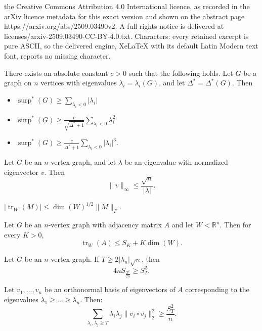 \documentclass[10pt,a4paper]{amsart}
\DeclareMathOperator{\surp}{surp}
\DeclareMathOperator{\trace}{tr}
\begin{document}
the Creative Commons Attribution 4.0 International licence, as recorded in the arXiv licence metadata for this exact version and shown on the abstract page https://arxiv.org/abs/2509.03490v2. A full rights notice is delivered at licenses/arxiv-2509.03490-CC-BY-4.0.txt. Characters: every retained excerpt is pure ASCII, so the delivered engine, XeLaTeX with its default Latin Modern text font, reports no missing character.
\begin{lemma}\label{lemma:surp_star}
There exists an absolute constant $c>0$ such that the following holds. Let $G$ be a graph on $n$ vertices with eigenvalues $\lambda_i=\lambda_i(G)$, and let $\Delta^*=\Delta^*(G)$. Then
\begin{itemize}
    \item[(i)] $\surp^*(G)\geq \displaystyle\sum_{\lambda_i<0}|\lambda_i|$
    \item[(ii)] $\surp^*(G)\geq\frac{c}{\sqrt{\Delta^*+1}}\displaystyle\sum_{\lambda_i<0}\lambda_i^2$
    \item[(iii)]  $\surp^*(G)\geq \frac{c}{\Delta^*+1}\displaystyle\sum_{\lambda_i<0}|\lambda_i|^3$.
\end{itemize}
\end{lemma}

\begin{lemma}\label{lemma:smooth_eigenvectors}
Let $G$ be an $n$-vertex graph, and let $\lambda$ be an eigenvalue with normalized eigenvector $v$. Then
$$\|v\|_{\infty}\leq \frac{\sqrt{n}}{|\lambda|}.$$
\end{lemma}

\begin{lemma}\label{lemma:W-trace_bound}
$|\trace_W(M)|\leq \dim(W)^{1/2}\|M\|_F.$
\end{lemma}

\begin{lemma}\label{lemma:trace_compression}
Let $G$ be an $n$-vertex graph with adjacency matrix $A$ and let $W<\mathbb{R}^n$. Then for every $K>0$,
$$\trace_W(A)\leq S_K+K\dim(W).$$
\end{lemma}

\begin{lemma}\label{lemma:main_smallest_eigenalue}
Let $G$ be an $n$-vertex graph. If $T\geq 2|\lambda_n|\sqrt{n}$, then
\begin{equation}\label{eqn:S_T bound}
    4nS_{\frac{T^2}{2n}}\geq S_T^2.
\end{equation}
\end{lemma}

\begin{claim}\label{claim:hadamard_sum}
Let $v_1,\dots,v_n$ be an orthonormal basis of eigenvectors of $A$ corresponding to the eigenvalues $\lambda_1\geq \dots\geq \lambda_n$. Then:
    $$\sum_{\lambda_i,\lambda_j\geq T}\lambda_i\lambda_j\|v_i\circ v_j\|_2^2\geq\frac{S_T^2}{n}.$$
\end{claim}
\end{document}
